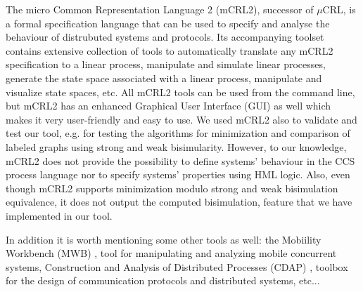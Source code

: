 The micro Common Representation Language 2 (mCRL2), successor of $\mu$CRL, is a formal specification language that can be used to specify and analyse the behaviour of distrubuted systems and protocols. Its accompanying toolset contains extensive collection of tools to automatically translate any mCRL2 specification to a linear process, manipulate and simulate linear processes, generate the state space associated with a linear process, manipulate and visualize state spaces, etc. All mCRL2 tools can be used from the command line, but mCRL2 has an enhanced Graphical User Interface (GUI) as well which makes it very user-friendly and easy to use. We used mCRL2 also to validate and test our tool, e.g. for testing the algorithms for minimization and comparison of labeled graphs using strong and weak bisimularity. However, to our knowledge, mCRL2 does not provide the possibility to define systems' behaviour in the CCS process language nor to specify systems' properties using HML logic. Also, even though mCRL2 supports minimization modulo strong and weak bisimulation equivalence, it does not output the computed bisimulation, feature that we have implemented in our tool.  

In addition it is worth mentioning some other tools as well: the Mobiility Workbench (MWB) \cite{MWB}, tool for manipulating and analyzing mobile concurrent systems, Construction and Analysis of Distributed Processes (CDAP) \cite{CDAP}, toolbox for the design of communication protocols and distributed systems, etc...
 
